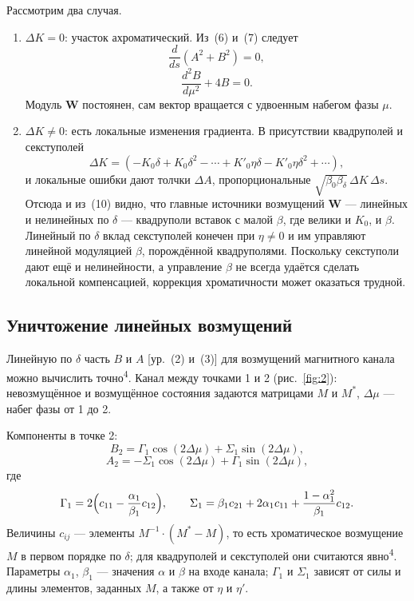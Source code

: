 \documentclass[11pt,a4paper]{article}
\begin{document}
Рассмотрим два случая.

\begin{enumerate}
\item[(i)] $\Delta K=0$: участок ахроматический. Из~(6) и~(7) следует
\begin{equation}
\frac{d}{ds}(A^2+B^2)=0,
\end{equation}
\begin{equation}
\frac{d^2 B}{d\mu^2}+4B=0.
\end{equation}
Модуль $\mathbf{W}$ постоянен, сам вектор вращается с удвоенным набегом фазы
$\mu$.

\item[(ii)] $\Delta K\neq 0$: есть локальные изменения градиента. В присутствии
квадруполей и секступолей
\begin{equation}
\Delta K=(-K_0\delta+K_0\delta^2-\cdots+K'_0\eta\delta-K'_0\eta\delta^2+\cdots),
\end{equation}
и локальные ошибки дают толчки $\Delta A$, пропорциональные
$\sqrt{\beta_0\beta_\delta}\,\Delta K\,\Delta s$. Отсюда и из~(10) видно, что
главные источники возмущений $\mathbf{W}$ --- линейных и нелинейных по
$\delta$ --- квадруполи вставок с малой $\beta$, где велики и $K_0$, и $\beta$.
Линейный по $\delta$ вклад секступолей конечен при $\eta\neq 0$ и им управляют
линейной модуляцией $\beta$, порождённой квадруполями. Поскольку секступоли дают
ещё и нелинейности, а управление $\beta$ не всегда удаётся сделать локальной
компенсацией, коррекция хроматичности может оказаться трудной.
\end{enumerate}

\subsection{Уничтожение линейных возмущений}

Линейную по $\delta$ часть $B$ и $A$ [ур.~(2) и~(3)] для возмущений магнитного
канала можно вычислить точно\textsuperscript{4}. Канал между точками 1 и 2
(рис.~\ref{fig:2}): невозмущённое и возмущённое состояния задаются матрицами
$M$ и $M^*$, $\Delta\mu$ --- набег фазы от 1 до 2.

Компоненты в точке 2:
\begin{equation}
B_2=\Gamma_1\cos(2\Delta\mu)+\Sigma_1\sin(2\Delta\mu),
\end{equation}
\begin{equation}
A_2=-\Sigma_1\cos(2\Delta\mu)+\Gamma_1\sin(2\Delta\mu),
\end{equation}
где
\[
\Gamma_1=2\Bigl(c_{11}-\frac{\alpha_1}{\beta_1}c_{12}\Bigr),\qquad
\Sigma_1=\beta_1 c_{21}+2\alpha_1 c_{11}+\frac{1-\alpha_1^2}{\beta_1}c_{12}.
\]
Величины $c_{ij}$ --- элементы $M^{-1}\cdot(M^*-M)$, то есть хроматическое
возмущение $M$ в первом порядке по $\delta$; для квадруполей и секступолей они
считаются явно\textsuperscript{4}. Параметры $\alpha_1$, $\beta_1$ --- значения
$\alpha$ и $\beta$ на входе канала; $\Gamma_1$ и $\Sigma_1$ зависят от силы и
длины элементов, заданных $M$, а также от $\eta$ и $\eta'$.
\end{document}
